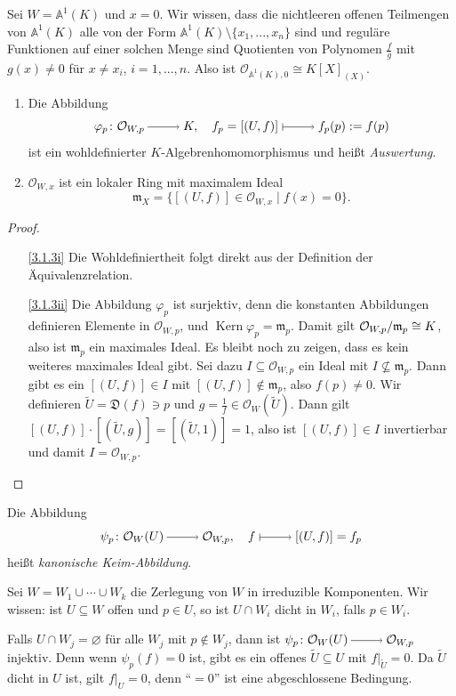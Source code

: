 \documentclass[a4paper,12pt]{scrbook}
\theoremstyle{keinenummern} %
\theoremstyle{mitnummern}
\theoremstyle{unserbeweis}
\newtheorem{proof}{Beweis}
\def\A{\mathbb{A}}
\def\O{\mathcal{O}}
\newcommand{\D}{\mathfrak{D}}
\def\m{\mathfrak{m}}
\newcommand{\Kern}{\operatorname{Kern}}
\renewcommand{\phi}{\varphi}
\newcommand{\leer}{\ensuremath{\varnothing}}
\newcommand{\restrict}[1]{|_{#1}}
\renewcommand{\dotsc}{\ensuremath{\!...}}
\newcommand{\ra}{\raisebox{-1pt}{\tikz{\draw[thin,shorten >=3pt, ->] (0,0) node{\hspace*{-2pt}} -- node{} (1,0);}}\penalty1000\relax}
\renewcommand{\mapsto}{\raisebox{-1pt}{\tikz{\draw[thin,shorten >=3pt, |->] (0,0) node{\hspace*{0pt}} -- node{} (1,0);}}\penalty1000\relax}
\newcommand{\Quotient}[2]{
  \mathchoice
  { %
    \raisebox{0.7ex}{\ensuremath{#1}}
    \ensuremath{\mkern-3mu}\big/\ensuremath{\mkern-3mu}
    \raisebox{-0.6ex}{\ensuremath{#2}}
  }
  { %
    #1/#2
  }
  { %
    #1/#2
  }
  { %
    #1/#2
  }
}
\begin{document}
\begin{bsp}\label{3.1.2}
  Sei $W=\A^1(K)$ und $x=0$. Wir wissen, dass die nichtleeren offenen Teilmengen von $\A^1(K)$ alle von der Form
  $\A^1(K)\setminus\{x_1,\dotsc,x_n\}$ sind und reguläre Funktionen auf einer solchen Menge sind Quotienten von Polynomen
  $\frac{f}{g}$ mit $g(x)\neq0$ für $x\neq x_i$, $i=1,\dotsc,n$. Also ist $\O_{\A^1(K),0}\cong K[X]_{(X)}$.
\end{bsp}

\begin{bem}\label{3.1.3}
  \begin{enumerate}
  \item{} Die Abbildung \[ \phi_{p}\colon \O_{W,p}\ra K,\quad f_p=[(U,f)]\mapsto f_p(p):=f(p) \]
    ist ein wohldefinierter $K$-Algebrenhomomorphismus und heißt \emph{Auswertung}.
  \item{} $\O_{W,x}$ ist ein lokaler Ring mit maximalem Ideal \[ \m_X = \{ [(U,f)]\in\O_{W,x}\mid f(x)=0\}. \]
  \end{enumerate}
\end{bem}
\begin{proof}
  \begin{enumerate}
  \item[\ref{3.1.3i}] Die Wohldefiniertheit folgt direkt aus der Definition der Äquivalenzrelation.
  \item[\ref{3.1.3ii}] Die Abbildung $\phi_p$ ist surjektiv, denn die konstanten Abbildungen definieren Elemente in $\O_{W,p}$,
    und $\Kern \phi_p=\m_p$. Damit gilt $\Quotient{\O_{W,p}}{\m_p}\cong K$, also ist $\m_p$ ein maximales Ideal. Es bleibt noch zu
    zeigen, dass es kein weiteres maximales Ideal gibt. Sei dazu $I\subseteq\O_{W,p}$ ein Ideal mit $I\not\subseteq \m_p$. Dann
    gibt es ein $[(U,f)]\in I$ mit $[(U,f)]\notin \m_p$, also $f(p)\neq0$. Wir definieren $\tilde{U}=\D(f)\ni p$ und
    $g=\frac1f\in\O_W(\tilde{U})$. Dann gilt $[(U,f)]\cdot[(\tilde{U},g)]=[(\tilde{U},1)]=1$, also ist $[(U,f)]\in I$
    invertierbar und damit $I=\O_{W,p}$.
  \end{enumerate}
\end{proof}

\begin{bem}\label{3.1.4}
  Die Abbildung \[ \psi_p\colon \O_W(U)\ra\O_{W,p},\quad f\mapsto[(U,f)]=f_p \] heißt \emph{kanonische Keim-Abbildung}.

  Sei $W=W_1\cup\dotsm\cup W_k$ die Zerlegung von $W$ in irreduzible Komponenten. Wir wissen: ist $U\subseteq W$ offen und $p\in
  U$, so ist $U\cap W_i$ dicht in $W_i$, falls $p\in W_i$.

  Falls $U\cap W_j=\leer$ für alle $W_j$ mit $p\notin W_j$, dann ist $\psi_p\colon\O_W(U)\ra\O_{W,p}$ injektiv. Denn wenn
  $\psi_p(f)=0$ ist, gibt es ein offenes $\tilde{U}\subseteq U$ mit $f\restrict{\tilde{U}}=0$. Da $\tilde{U}$ dicht in $U$ ist,
  gilt $f\restrict{U}=0$, denn \enquote{$=0$} ist eine abgeschlossene Bedingung.
\end{bem}
\end{document}
